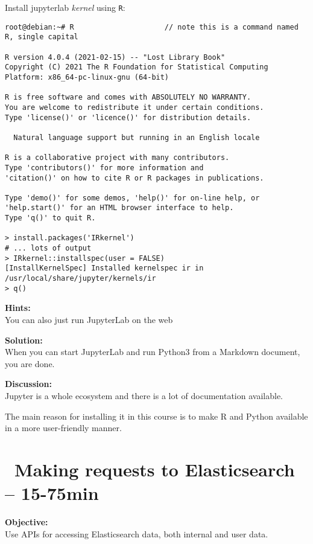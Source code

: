 \documentclass[a4paper,11pt,notitlepage]{report}
\begin{document}
Install jupyterlab \emph{kernel} using \verb+R+:
\begin{verbatim}
root@debian:~# R                     // note this is a command named R, single capital

R version 4.0.4 (2021-02-15) -- "Lost Library Book"
Copyright (C) 2021 The R Foundation for Statistical Computing
Platform: x86_64-pc-linux-gnu (64-bit)

R is free software and comes with ABSOLUTELY NO WARRANTY.
You are welcome to redistribute it under certain conditions.
Type 'license()' or 'licence()' for distribution details.

  Natural language support but running in an English locale

R is a collaborative project with many contributors.
Type 'contributors()' for more information and
'citation()' on how to cite R or R packages in publications.

Type 'demo()' for some demos, 'help()' for on-line help, or
'help.start()' for an HTML browser interface to help.
Type 'q()' to quit R.

> install.packages('IRkernel')
# ... lots of output
> IRkernel::installspec(user = FALSE)
[InstallKernelSpec] Installed kernelspec ir in /usr/local/share/jupyter/kernels/ir
> q()
\end{verbatim}



{\bf Hints:}\\
You can also just run JupyterLab on the web \smiley

{\bf Solution:}\\
When you can start JupyterLab and run Python3 from a Markdown document, you are done.


{\bf Discussion:}\\
Jupyter is a whole ecosystem and there is a lot of documentation available.

The main reason for installing it in this course is to make R and Python available in a more user-friendly manner.



\chapter{\faExclamationTriangle\ Making requests to Elasticsearch -- 15-75min}
\label{ex:es-rest-api}


{\bf Objective:}\\
Use APIs for accessing Elasticsearch data, both internal and user data.
\end{document}
